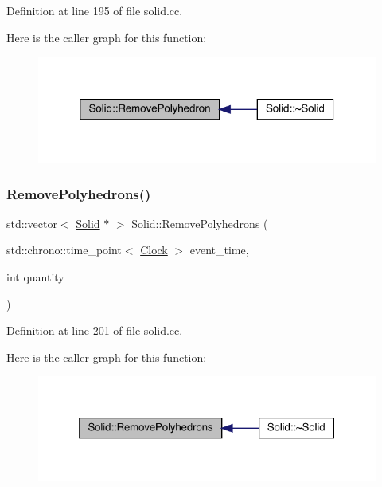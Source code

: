 Definition at line 195 of file solid.\+cc.

Here is the caller graph for this function\+:
\nopagebreak
\begin{figure}[H]
\begin{center}
\leavevmode
\includegraphics[width=320pt]{class_solid_a1233a3fe43abca7d2a0f83d724fd6640_icgraph}
\end{center}
\end{figure}
\mbox{\label{class_solid_a0fc53641571eb796c9d6bc33ae7a7138}} 
\subsubsection{\texorpdfstring{Remove\+Polyhedrons()}{RemovePolyhedrons()}}
{\footnotesize\ttfamily std\+::vector$<$ \hyperlink{class_solid}{Solid} $\ast$ $>$ Solid\+::\+Remove\+Polyhedrons (\begin{DoxyParamCaption}\item[{std\+::chrono\+::time\+\_\+point$<$ \hyperlink{universe_8h_a0ef8d951d1ca5ab3cfaf7ab4c7a6fd80}{Clock} $>$}]{event\+\_\+time,  }\item[{int}]{quantity }\end{DoxyParamCaption})}



Definition at line 201 of file solid.\+cc.

Here is the caller graph for this function\+:
\nopagebreak
\begin{figure}[H]
\begin{center}
\leavevmode
\includegraphics[width=325pt]{class_solid_a0fc53641571eb796c9d6bc33ae7a7138_icgraph}
\end{center}
\end{figure}
\mbox{\label{class_solid_ac43dc78fa7f6a3348fc99751ff6bbc52}} 
